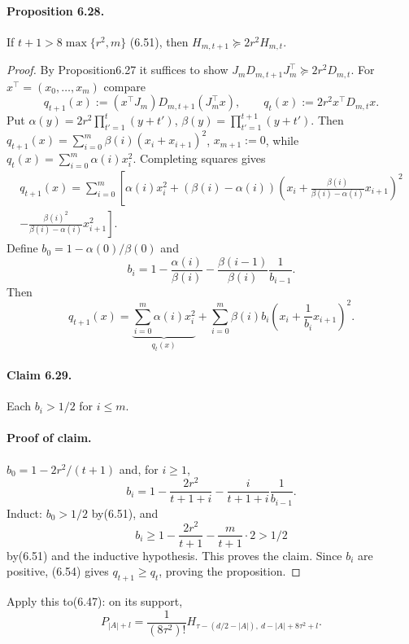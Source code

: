 \documentclass[10pt,a4paper]{article}
\begin{document}
\paragraph{Proposition 6.28.} If $t+1>8\max\{r^2,m\}$ (6.51), then $H_{m,t+1}\succeq2r^2H_{m,t}$.
\begin{proof}By Proposition6.27 it suffices to show $J_mD_{m,t+1}J_m^\top\succeq2r^2D_{m,t}$. For $x^\top=(x_0,\ldots,x_m)$ compare
\[q_{t+1}(x):=(x^\top J_m)D_{m,t+1}(J_m^\top x),\qquad q_t(x):=2r^2x^\top D_{m,t}x.\tag{6.52}\]
Put $\alpha(y)=2r^2\prod_{t'=1}^t(y+t')$, $\beta(y)=\prod_{t'=1}^{t+1}(y+t')$. Then $q_{t+1}(x)=\sum_{i=0}^m\beta(i)(x_i+x_{i+1})^2$, $x_{m+1}:=0$, while $q_t(x)=\sum_{i=0}^m\alpha(i)x_i^2$. Completing squares gives
\begin{multline*}q_{t+1}(x)=\sum_{i=0}^m\left[\alpha(i)x_i^2+(\beta(i)-\alpha(i))\left(x_i+\frac{\beta(i)}{\beta(i)-\alpha(i)}x_{i+1}\right)^2\right.\\\left.-\frac{\beta(i)^2}{\beta(i)-\alpha(i)}x_{i+1}^2\right].\end{multline*}
Define $b_0=1-\alpha(0)/\beta(0)$ and
\[b_i=1-\frac{\alpha(i)}{\beta(i)}-\frac{\beta(i-1)}{\beta(i)}\frac1{b_{i-1}}.\tag{6.53}\]
Then
\[q_{t+1}(x)=\underbrace{\sum_{i=0}^m\alpha(i)x_i^2}_{q_t(x)}+\sum_{i=0}^m\beta(i)b_i\left(x_i+\frac1{b_i}x_{i+1}\right)^2.\tag{6.54}\]
\paragraph{Claim 6.29.} Each $b_i>1/2$ for $i\le m$.
\paragraph{Proof of claim.} $b_0=1-2r^2/(t+1)$ and, for $i\ge1$,
\[b_i=1-\frac{2r^2}{t+1+i}-\frac i{t+1+i}\frac1{b_{i-1}}.\tag{6.55}\]
Induct: $b_0>1/2$ by(6.51), and
\[b_i\ge1-\frac{2r^2}{t+1}-\frac m{t+1}\cdot2>1/2\]
by(6.51) and the inductive hypothesis. This proves the claim. Since $b_i$ are positive, (6.54) gives $q_{t+1}\ge q_t$, proving the proposition.\end{proof}
Apply this to(6.47): on its support,
\[P_{|A|+l}=\frac1{(8\tau^2)!}H_{\tau-(d/2-|A|),\ d-|A|+8\tau^2+l}.\]
\end{document}
